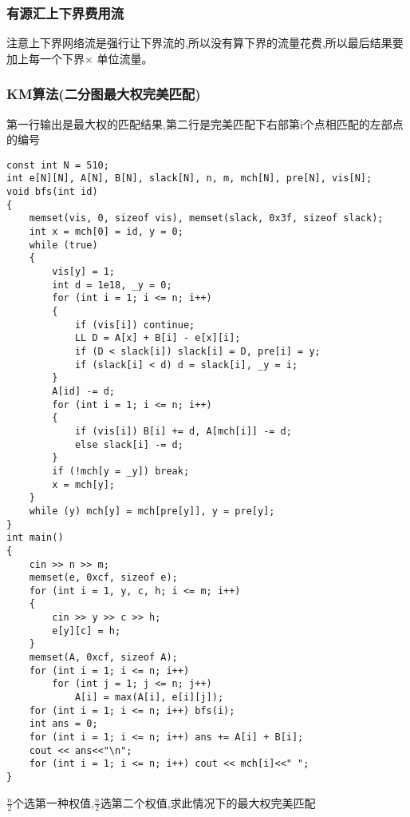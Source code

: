 \documentclass[a4paper, fontset=none]{ctexart}
\begin{document}
\subsubsection{有源汇上下界费用流}

注意上下界网络流是强行让下界流的,所以没有算下界的流量花费,所以最后结果要加上每一个下界$\times$ 单位流量。
\subsubsection{KM算法(二分图最大权完美匹配)}

第一行输出是最大权的匹配结果,第二行是完美匹配下右部第i个点相匹配的左部点的编号

\begin{verbatim}
const int N = 510;
int e[N][N], A[N], B[N], slack[N], n, m, mch[N], pre[N], vis[N];
void bfs(int id)
{
    memset(vis, 0, sizeof vis), memset(slack, 0x3f, sizeof slack);
    int x = mch[0] = id, y = 0;
    while (true)
    {
        vis[y] = 1;
        int d = 1e18, _y = 0;
        for (int i = 1; i <= n; i++)
        {
            if (vis[i]) continue;
            LL D = A[x] + B[i] - e[x][i];
            if (D < slack[i]) slack[i] = D, pre[i] = y;
            if (slack[i] < d) d = slack[i], _y = i;
        }
        A[id] -= d;
        for (int i = 1; i <= n; i++)
        {
            if (vis[i]) B[i] += d, A[mch[i]] -= d;
            else slack[i] -= d;
        }
        if (!mch[y = _y]) break;
        x = mch[y];
    }
    while (y) mch[y] = mch[pre[y]], y = pre[y];
}
int main()
{
    cin >> n >> m;
    memset(e, 0xcf, sizeof e);
    for (int i = 1, y, c, h; i <= m; i++)
    {
        cin >> y >> c >> h;
        e[y][c] = h;
    }
    memset(A, 0xcf, sizeof A);
    for (int i = 1; i <= n; i++)
        for (int j = 1; j <= n; j++)
            A[i] = max(A[i], e[i][j]);
    for (int i = 1; i <= n; i++) bfs(i);
    int ans = 0;
    for (int i = 1; i <= n; i++) ans += A[i] + B[i];
    cout << ans<<"\n";
    for (int i = 1; i <= n; i++) cout << mch[i]<<" ";
}
\end{verbatim}

$\frac{n}{2}$个选第一种权值,$\frac{n}{2}$选第二个权值,求此情况下的最大权完美匹配
\end{document}
